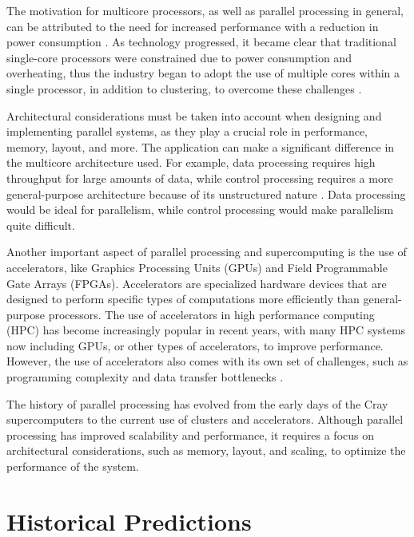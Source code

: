 \documentclass[twocolumn,12pt, singlespace]{IEEEtran}
\begin{document}
	The motivation for multicore processors, as well as parallel processing in general, can be attributed to the need for increased performance with a reduction in power consumption \cite{Bell:1999}. As technology progressed, it became clear that traditional single-core processors were constrained due to power consumption and overheating, thus the industry began to adopt the use of multiple cores within a single processor, in addition to clustering, to overcome these challenges \cite{Bell:2001}. 

	Architectural considerations must be taken into account when designing and implementing parallel systems, as they play a crucial role in performance, memory, layout, and more. The application can make a significant difference in the multicore architecture used. For example, data processing requires high throughput for large amounts of data, while control processing requires a more general-purpose architecture because of its unstructured nature \cite{Bell:1999}. Data processing would be ideal for parallelism, while control processing would make parallelism quite difficult.
	
	Another important aspect of parallel processing and supercomputing is the use of accelerators, like Graphics Processing Units (GPUs) and Field Programmable Gate Arrays (FPGAs). Accelerators are specialized hardware devices that are designed to perform specific types of computations more efficiently than general-purpose processors. The use of accelerators in high performance computing (HPC) has become increasingly popular in recent years, with many HPC systems now including GPUs, or other types of accelerators, to improve performance. However, the use of accelerators also comes with its own set of challenges, such as programming complexity and data transfer bottlenecks \cite{Bakhoda:2009}.
	
	The history of parallel processing has evolved from the early days of the Cray supercomputers to the current use of clusters and accelerators. Although parallel processing has improved scalability and performance, it requires a focus on architectural considerations, such as memory, layout, and scaling, to optimize the performance of the system.\\

\section{Historical Predictions}
\end{document}
